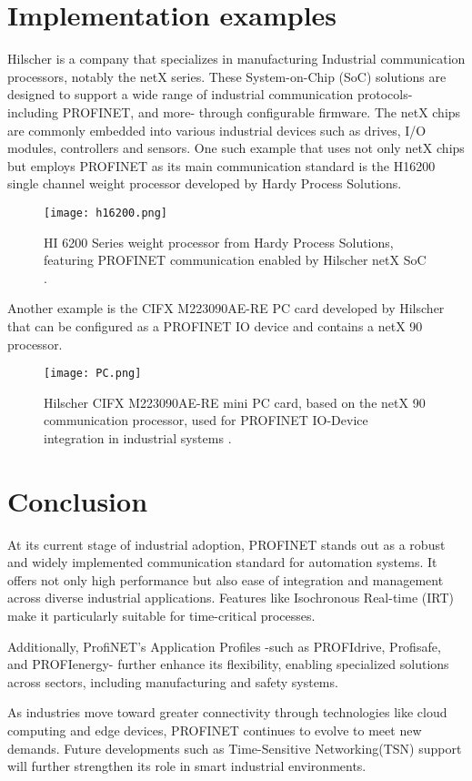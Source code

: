 \documentclass[conference]{IEEEtran}
\begin{document}
\section{Implementation examples}
Hilscher is a company that specializes in manufacturing Industrial communication processors, notably the netX series. These System-on-Chip (SoC) solutions are designed to support a wide range of industrial communication protocols- including PROFINET, and more- through configurable firmware. 
The netX chips are commonly embedded into various industrial devices such as drives, I/O modules, controllers and sensors. One such example that uses not only netX chips but employs PROFINET as its main communication standard is the H16200 single channel weight processor developed by Hardy Process Solutions.
\begin{figure}[H]
    \centering
    \texttt{[image: h16200.png]}
    \caption{HI 6200 Series weight processor from Hardy Process Solutions, featuring PROFINET communication enabled by Hilscher netX SoC \cite{hi6200hardy}.}
    \label{fig:hi6200}
\end{figure}
Another example is the CIFX M223090AE-RE PC card developed by Hilscher that can be configured as a PROFINET IO device and contains a netX 90 processor.

\begin{figure}[H]
    \centering
    \texttt{[image: PC.png]}
    \caption{Hilscher CIFX M223090AE-RE mini PC card, based on the netX 90 communication processor, used for PROFINET IO-Device integration in industrial systems \cite{hilscherCIFX}.}
    \label{fig:cifx_card}
\end{figure}

\section{Conclusion}
At its current stage of industrial adoption, PROFINET stands out as a robust and widely implemented communication standard for automation systems. It offers not only high performance but also ease of integration and management across diverse industrial applications. Features like Isochronous Real-time (IRT) make it particularly suitable for time-critical processes.

Additionally, ProfiNET's Application Profiles -such as PROFIdrive, Profisafe, and PROFIenergy- further enhance its flexibility, enabling specialized solutions across sectors, including manufacturing and safety systems.

As industries move toward greater connectivity through technologies like cloud computing and edge devices, PROFINET continues to evolve to meet new demands. Future developments such as Time-Sensitive Networking(TSN) support will further strengthen its role in smart industrial environments. 

\printbibliography
\end{document}

